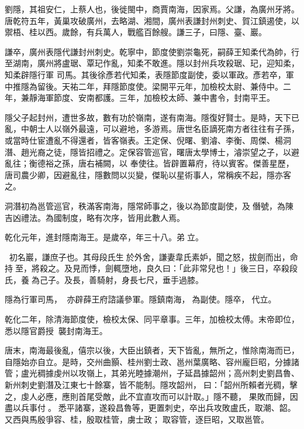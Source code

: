 
\begin{pinyinscope}

 劉隱，其祖安仁，上蔡人也，後徙閩中，商賈南海，因家焉。父謙，為廣州牙將。唐乾符五年，黃巢攻破廣州，去略湖、湘間，廣州表謙封州刺史、賀江鎮遏使，以禦梧、桂以西。歲餘，有兵萬人，戰艦百餘艘。謙三子，曰隱、臺、巖。



 謙卒，廣州表隱代謙封州刺史。乾寧中，節度使劉崇龜死，嗣薛王知柔代為帥，行至湖南，廣州將盧琚、覃玘作亂，知柔不敢進。隱以封州兵攻殺琚、玘，迎知柔，知柔辟隱行軍
 司馬。其後徐彥若代知柔，表隱節度副使，委以軍政。彥若卒，軍中推隱為留後。天祐二年，拜隱節度使。梁開平元年，加檢校太尉、兼侍中。二年，兼靜海軍節度、安南都護。三年，加檢校太師、兼中書令，封南平王。



 隱父子起封州，遭世多故，數有功於嶺南，遂有南海。隱復好賢士。是時，天下已亂，中朝士人以嶺外最遠，可以避地，多游焉。唐世名臣謫死南方者往往有子孫，或當時仕宦遭亂不得還者，皆客嶺表。王定保、倪曙、劉濬、李衡、周傑、楊洞潛、趙光裔之徒，隱皆招禮之。定保容管巡官，曙唐太學博士，濬崇望之子，以避亂往；衡德裕之孫，唐右補闕，以
 奉使往。皆辟置幕府，待以賓客。傑善星歷，唐司農少卿，因避亂往，隱數問以災變，傑恥以星術事人，常稱疾不起，隱亦客之。



 洞潛初為邕管巡官，秩滿客南海，隱常師事之，後以為節度副使，及僭號，為陳吉凶禮法。為國制度，略有次序，皆用此數人焉。



 乾化元年，進封隱南海王。是歲卒，年三十八。弟立。



 ，初名巖，謙庶子也。其母段氏生於外舍，謙妻韋氏素妒，聞之怒，拔劍而出，命持至，將殺之。及見而悸，劍輒墮地，良久曰：「此非常兒也！」後三日，卒殺段氏，養為己子。及長，善騎射，身長七尺，垂手過膝。



 隱為行軍司馬，
 亦辟薛王府諮議參軍。隱鎮南海，為副使。隱卒，代立。



 乾化二年，除清海節度使，檢校太保、同平章事。三年，加檢校太傅。末帝即位，悉以隱官爵授，襲封南海王。



 唐末，南海最後亂，僖宗以後，大臣出鎮者，天下皆亂，無所之，惟除南海而已，自隱始亦自立。是時，交州曲顥、桂州劉士政、邕州葉廣略、容州龐巨昭，分據諸管；盧光稠據虔州以攻嶺上，其弟光睦據潮州，子延昌據韶州；高州刺史劉昌魯、新州刺史劉潛及江東七十餘寨，皆不能制。隱攻韶州，曰：「韶州所賴者光稠，擊之，虔人必應，應則首尾受敵，此不宜直攻而可以計取。」隱不聽，
 果敗而歸，因盡以兵事付。悉平諸寨，遂殺昌魯等，更置刺史，卒出兵攻敗盧氏，取潮、韶。又西與馬殷爭容、桂，殷取桂管，虜士政；取容管，逐巨昭，又取邕管。




\end{pinyinscope}
